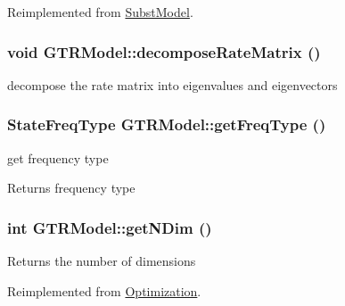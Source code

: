 Reimplemented from \hyperlink{classSubstModel_a83997a2aaea95f2c994d88a9d1cb190e}{SubstModel}.\hypertarget{classGTRModel_ab73647f93c4fdde88c62a775586ae9ea}{
\subsubsection[{decomposeRateMatrix}]{\setlength{\rightskip}{0pt plus 5cm}void GTRModel::decomposeRateMatrix ()}}
\label{classGTRModel_ab73647f93c4fdde88c62a775586ae9ea}
decompose the rate matrix into eigenvalues and eigenvectors \hypertarget{classGTRModel_af2447a8e79a031706028d36beb6931bd}{
\subsubsection[{getFreqType}]{\setlength{\rightskip}{0pt plus 5cm}StateFreqType GTRModel::getFreqType ()}}
\label{classGTRModel_af2447a8e79a031706028d36beb6931bd}
get frequency type \begin{DoxyReturn}{Returns}
frequency type 
\end{DoxyReturn}
\hypertarget{classGTRModel_a6e2066898fbbb245596d4a97dd8ee33c}{
\subsubsection[{getNDim}]{\setlength{\rightskip}{0pt plus 5cm}int GTRModel::getNDim ()}}
\label{classGTRModel_a6e2066898fbbb245596d4a97dd8ee33c}
\begin{DoxyReturn}{Returns}
the number of dimensions 
\end{DoxyReturn}


Reimplemented from \hyperlink{classOptimization_a6d04cefb0969f3cac9b607aa1412eb57}{Optimization}.


